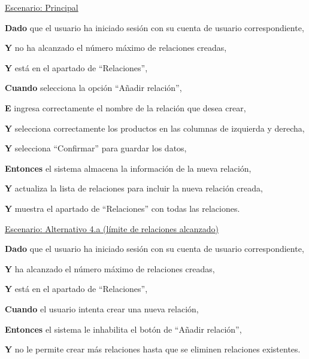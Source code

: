 \underline{Escenario: Principal}\par
\vspace{0.15cm}
\textbf{Dado} que el usuario ha iniciado sesión con su cuenta de usuario correspondiente,\par
\textbf{Y} no ha alcanzado el número máximo de relaciones creadas,\par
\textbf{Y} está en el apartado de \enquote{Relaciones},\par
\textbf{Cuando} selecciona la opción \enquote{Añadir relación},\par
\textbf{E} ingresa correctamente el nombre de la relación que desea crear,\par
\textbf{Y} selecciona correctamente los productos en las columnas de izquierda y derecha,\par
\textbf{Y} selecciona \enquote{Confirmar} para guardar los datos,\par
\textbf{Entonces} el sistema almacena la información de la nueva relación,\par
\textbf{Y} actualiza la lista de relaciones para incluir la nueva relación creada,\par
\textbf{Y} muestra el apartado de \enquote{Relaciones} con todas las relaciones.\par

\vspace{0.20cm}

\underline{Escenario: Alternativo 4.a (límite de relaciones alcanzado)}\par
\vspace{0.15cm}
\textbf{Dado} que el usuario ha iniciado sesión con su cuenta de usuario correspondiente,\par
\textbf{Y} ha alcanzado el número máximo de relaciones creadas,\par
\textbf{Y} está en el apartado de \enquote{Relaciones},\par
\textbf{Cuando} el usuario intenta crear una nueva relación,\par
\textbf{Entonces} el sistema le inhabilita el botón de \enquote{Añadir relación},\par
\textbf{Y} no le permite crear más relaciones hasta que se eliminen relaciones existentes.\par

\vspace{0.20cm}
\newpage %

